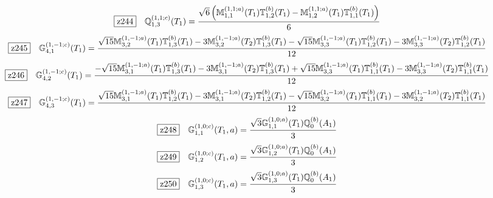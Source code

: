 \documentclass[fleqn,10pt,landscape]{jsarticle}
\begin{document}
\begin{dmath*}
\hspace*{3mm}\fbox{z244}\quad \mathbb{Q}_{1,3}^{(1,1;c)}(T_{1})=\frac{\sqrt{6} \left(\mathbb{M}_{1,1}^{(1,1;a)}(T_{1}) \mathbb{T}_{1,2}^{(b)}(T_{1}) - \mathbb{M}_{1,2}^{(1,1;a)}(T_{1}) \mathbb{T}_{1,1}^{(b)}(T_{1})\right)}{6}
\end{dmath*}
\begin{dmath*}
\hspace*{3mm}\fbox{z245}\quad \mathbb{G}_{4,1}^{(1,-1;c)}(T_{1})=\frac{\sqrt{15} \mathbb{M}_{3,2}^{(1,-1;a)}(T_{1}) \mathbb{T}_{1,3}^{(b)}(T_{1}) - 3 \mathbb{M}_{3,2}^{(1,-1;a)}(T_{2}) \mathbb{T}_{1,3}^{(b)}(T_{1}) - \sqrt{15} \mathbb{M}_{3,3}^{(1,-1;a)}(T_{1}) \mathbb{T}_{1,2}^{(b)}(T_{1}) - 3 \mathbb{M}_{3,3}^{(1,-1;a)}(T_{2}) \mathbb{T}_{1,2}^{(b)}(T_{1})}{12}
\end{dmath*}
\begin{dmath*}
\hspace*{3mm}\fbox{z246}\quad \mathbb{G}_{4,2}^{(1,-1;c)}(T_{1})=\frac{- \sqrt{15} \mathbb{M}_{3,1}^{(1,-1;a)}(T_{1}) \mathbb{T}_{1,3}^{(b)}(T_{1}) - 3 \mathbb{M}_{3,1}^{(1,-1;a)}(T_{2}) \mathbb{T}_{1,3}^{(b)}(T_{1}) + \sqrt{15} \mathbb{M}_{3,3}^{(1,-1;a)}(T_{1}) \mathbb{T}_{1,1}^{(b)}(T_{1}) - 3 \mathbb{M}_{3,3}^{(1,-1;a)}(T_{2}) \mathbb{T}_{1,1}^{(b)}(T_{1})}{12}
\end{dmath*}
\begin{dmath*}
\hspace*{3mm}\fbox{z247}\quad \mathbb{G}_{4,3}^{(1,-1;c)}(T_{1})=\frac{\sqrt{15} \mathbb{M}_{3,1}^{(1,-1;a)}(T_{1}) \mathbb{T}_{1,2}^{(b)}(T_{1}) - 3 \mathbb{M}_{3,1}^{(1,-1;a)}(T_{2}) \mathbb{T}_{1,2}^{(b)}(T_{1}) - \sqrt{15} \mathbb{M}_{3,2}^{(1,-1;a)}(T_{1}) \mathbb{T}_{1,1}^{(b)}(T_{1}) - 3 \mathbb{M}_{3,2}^{(1,-1;a)}(T_{2}) \mathbb{T}_{1,1}^{(b)}(T_{1})}{12}
\end{dmath*}
\begin{dmath*}
\hspace*{3mm}\fbox{z248}\quad \mathbb{G}_{1,1}^{(1,0;c)}(T_{1},a)=\frac{\sqrt{3} \mathbb{G}_{1,1}^{(1,0;a)}(T_{1}) \mathbb{Q}_{0}^{(b)}(A_{1})}{3}
\end{dmath*}
\begin{dmath*}
\hspace*{3mm}\fbox{z249}\quad \mathbb{G}_{1,2}^{(1,0;c)}(T_{1},a)=\frac{\sqrt{3} \mathbb{G}_{1,2}^{(1,0;a)}(T_{1}) \mathbb{Q}_{0}^{(b)}(A_{1})}{3}
\end{dmath*}
\begin{dmath*}
\hspace*{3mm}\fbox{z250}\quad \mathbb{G}_{1,3}^{(1,0;c)}(T_{1},a)=\frac{\sqrt{3} \mathbb{G}_{1,3}^{(1,0;a)}(T_{1}) \mathbb{Q}_{0}^{(b)}(A_{1})}{3}
\end{dmath*}
\end{document}
